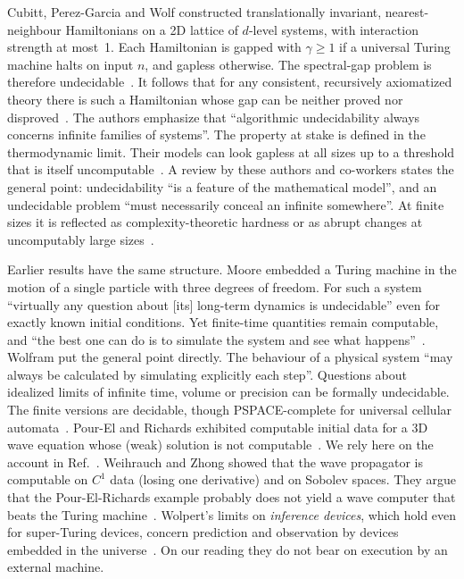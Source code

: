 Cubitt, Perez-Garcia and Wolf constructed translationally invariant,
nearest-neighbour Hamiltonians on a 2D lattice of $d$-level systems, with
interaction strength at most~1. Each Hamiltonian is gapped with $\gamma\ge1$
if a universal Turing machine halts on input $n$, and gapless otherwise. The
spectral-gap problem is therefore undecidable~\cite{Cubitt2015undecidability,Cubitt2022undecidability}.
It follows that for any consistent, recursively axiomatized theory there is
such a Hamiltonian whose gap can be neither proved nor
disproved~\cite{Cubitt2022undecidability}. The authors emphasize that
``algorithmic undecidability always concerns infinite families of systems''.
The property at stake is defined in the thermodynamic limit. Their models can
look gapless at all sizes up to a threshold that is itself
uncomputable~\cite{Cubitt2015undecidability}. A review by these authors and
co-workers states the general point: undecidability ``is a feature of the
mathematical model'', and an undecidable problem ``must necessarily conceal an
infinite somewhere''. At finite sizes it is reflected as complexity-theoretic
hardness or as abrupt changes at uncomputably large
sizes~\cite{PeralesEceiza2025undecidability}.

Earlier results have the same structure. Moore embedded a Turing machine in
the motion of a single particle with three degrees of freedom. For such a
system ``virtually any question about [its] long-term dynamics is
undecidable'' even for exactly known initial conditions. Yet finite-time
quantities remain computable, and ``the best one can do is to simulate the
system and see what happens''~\cite{Moore1990unpredictability}. Wolfram put
the general point directly. The behaviour of a physical system ``may always be
calculated by simulating explicitly each step''. Questions about idealized limits
of infinite time, volume or precision can be formally undecidable. The finite versions are decidable, though PSPACE-complete
for universal cellular automata~\cite{Wolfram1985undecidability}. Pour-El and
Richards exhibited computable initial data for a 3D wave equation whose (weak)
solution is not computable~\cite{PourEl1981wave}. We rely here on the account
in Ref.~\cite{PeralesEceiza2025undecidability}. Weihrauch and Zhong showed
that the wave propagator is computable on $C^1$ data (losing one derivative)
and on Sobolev spaces. They argue that the Pour-El-Richards example probably
does not yield a wave computer that beats the Turing
machine~\cite{Weihrauch2002is}. Wolpert's limits on \emph{inference devices}, which hold even for
super-Turing devices, concern prediction and observation by devices embedded
in the universe~\cite{Wolpert2008physical}. On our reading they do not bear on
execution by an external machine.


